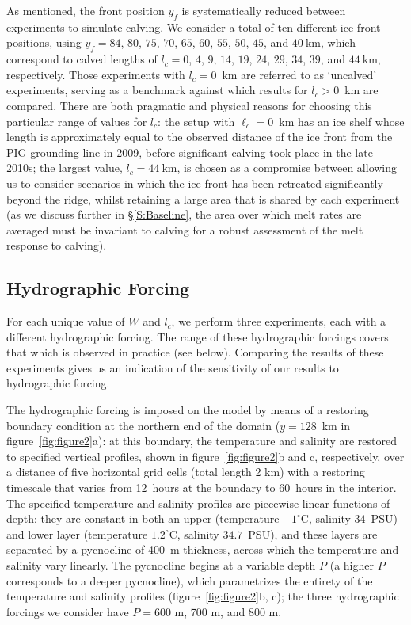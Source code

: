 \documentclass[draft]{agujournal2019}
\begin{document}
As mentioned, the front position $y_f$ is systematically reduced between experiments to simulate calving. We consider a total of ten different ice front positions, using $y_f=84$, $80$, $75$, $70$, $65$, $60$, $55$, $50$, $45$, and $40~\text{km}$, which correspond to calved lengths of $l_c=0$, $4$, $9$, $14$, $19$, $24$, $29$, $34$, $39$, and $44~\text{km}$, respectively. Those experiments with $l_c = 0$~km are referred to as `uncalved' experiments, serving as a benchmark against which results for $l_c >0$~km are compared. There are both pragmatic and physical reasons for choosing this particular range of values for $l_c$: the setup with $\ell_c = 0$~km has an ice shelf whose length is approximately equal to the observed distance of the ice front from the PIG grounding line in 2009, before significant calving took place in the late 2010s; the largest value, $l_c = 44~\text{km}$, is chosen as a compromise between allowing us to consider scenarios in which the ice front has been retreated significantly beyond the ridge, whilst retaining a large area that is shared by each experiment (as we discuss further in \S\ref{S:Baseline}, the area over which melt rates are averaged must be invariant to calving for a robust assessment of the melt response to calving).

\subsection{Hydrographic Forcing}\label{S:Experiment:Hydrography}
For each unique value of $W$ and $l_c$, we perform three experiments, each with a different hydrographic forcing. The range of these hydrographic forcings covers that which is observed in practice (see below). Comparing the results of these experiments gives us an indication of the sensitivity of our results to hydrographic forcing. 

The hydrographic forcing is imposed on the model by means of a restoring boundary condition at the northern end of the domain ($y = 128$~km in figure~\ref{fig:figure2}a): at this boundary, the temperature and salinity are restored to specified vertical profiles, shown in figure~\ref{fig:figure2}b and c, respectively, over a distance of five horizontal grid cells (total length 2 km) with a restoring timescale that varies from 12~hours at the boundary to 60~hours in the interior.  The specified temperature and salinity profiles are piecewise linear functions of depth: they are constant in both an upper (temperature $-1^\circ$C, salinity $34$~PSU) and lower layer (temperature $1.2^\circ$C, salinity $34.7$~PSU), and these layers are separated by a pycnocline of 400~m thickness, across which the temperature and salinity vary linearly. The pycnocline begins at a variable depth $P$ (a higher $P$ corresponds to a deeper pycnocline), which parametrizes the entirety of the temperature and salinity profiles (figure~\ref{fig:figure2}b, c); the three hydrographic forcings we consider have $P=600$ m, 700 m, and 800 m.
\end{document}
